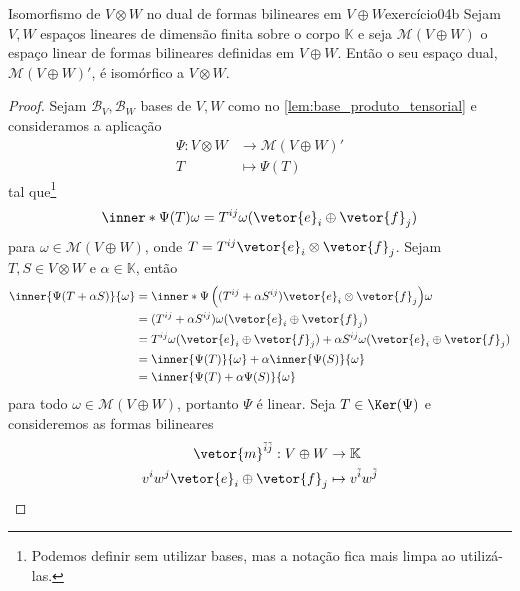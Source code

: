 \begin{proposition}{Isomorfismo de \(V \otimes W\) no dual de formas bilineares em \(V \oplus W\)}{exercício04b}
    Sejam \(V, W\) espaços lineares de dimensão finita sobre o corpo \(\mathbb{K}\) e seja \(\mathscr{M}(V \oplus W)\) o espaço linear de formas bilineares definidas em \(V \oplus W\). Então o seu espaço dual, \(\mathscr{M}(V \oplus W)'\), é isomórfico a \(V \otimes W\).
\end{proposition}
\begin{proof}
    Sejam \(\mathscr{B}_V, \mathscr{B}_W\) bases de \(V, W\) como no \cref{lem:base_produto_tensorial} e consideramos a aplicação
    \begin{align*}
        \Psi : V \otimes W &\to \mathscr{M}(V \oplus W)'\\
                         T &\mapsto \Psi(T)
    \end{align*}
    tal que\footnote{Podemos definir sem utilizar bases, mas a notação fica mais limpa ao utilizá-las.}
    \begin{equation*}
        \inner*{\Psi(T)}{\omega} = T^{ij}\omega(\vetor{e}_{i} \oplus \vetor{f}_{j})
    \end{equation*}
    para \(\omega \in \mathscr{M}(V \oplus W)\), onde \(T = T^{ij}\vetor{e}_i\otimes \vetor{f}_j\). Sejam \(T, S\in V \otimes W\) e \(\alpha \in \mathbb{K}\), então
    \begin{align*}
        \inner{\Psi(T + \alpha S)}{\omega} &= \inner*{\Psi\left((T^{ij} + \alpha S^{ij})\vetor{e}_i\otimes \vetor{f}_j\right)}{\omega}\\
                                           &= (T^{ij} + \alpha S^{ij})\omega(\vetor{e}_i \oplus \vetor{f}_j)\\
                                           &= T^{ij} \omega(\vetor{e}_i\oplus \vetor{f}_j) + \alpha S^{ij} \omega(\vetor{e}_i \oplus \vetor{f}_j)\\
                                           &= \inner{\Psi(T)}{\omega} + \alpha \inner{\Psi(S)}{\omega}\\
                                           &= \inner{\Psi(T) + \alpha \Psi(S)}{\omega}
    \end{align*}
    para todo \(\omega \in \mathscr{M}(V\oplus W)\), portanto \(\Psi\) é linear. Seja \(T \in \Ker(\Psi)\) e consideremos as formas bilineares
    \begin{align*}
        \vetor{m}^{\tilde{i}\tilde{j}} : V \oplus W &\to \mathbb{K}\\
        v^iw^j \vetor{e}_i \oplus \vetor{f}_j &\mapsto v^{\tilde{i}} w^{\tilde{j}}

\end{align*}
\end{proof}
